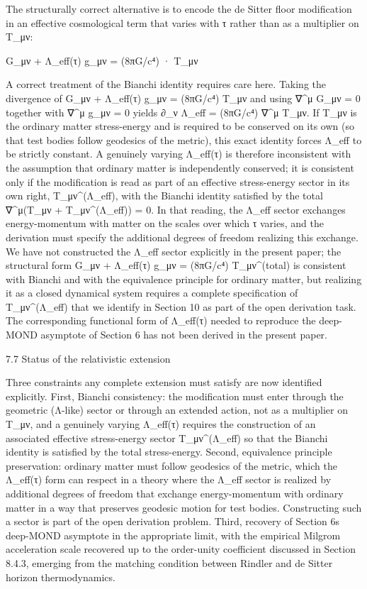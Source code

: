 \documentclass[11pt]{article}
\begin{document}
The structurally correct alternative is to encode the de Sitter floor modification in an effective cosmological term that varies with τ rather than as a multiplier on T\_μν:

G\_μν + Λ\_eff(τ) g\_μν = (8πG/c⁴) · T\_μν

A correct treatment of the Bianchi identity requires care here. Taking the divergence of G\_μν + Λ\_eff(τ) g\_μν = (8πG/c⁴) T\_μν and using ∇\^{}μ G\_μν = 0 together with ∇\^{}μ g\_μν = 0 yields ∂\_ν Λ\_eff = (8πG/c⁴) ∇\^{}μ T\_μν. If T\_μν is the ordinary matter stress-energy and is required to be conserved on its own (so that test bodies follow geodesics of the metric), this exact identity forces Λ\_eff to be strictly constant. A genuinely varying Λ\_eff(τ) is therefore inconsistent with the assumption that ordinary matter is independently conserved; it is consistent only if the modification is read as part of an effective stress-energy sector in its own right, T\_μν\^{}(Λ\_eff), with the Bianchi identity satisfied by the total ∇\^{}μ(T\_μν + T\_μν\^{}(Λ\_eff)) = 0. In that reading, the Λ\_eff sector exchanges energy-momentum with matter on the scales over which τ varies, and the derivation must specify the additional degrees of freedom realizing this exchange. We have not constructed the Λ\_eff sector explicitly in the present paper; the structural form G\_μν + Λ\_eff(τ) g\_μν = (8πG/c⁴) T\_μν\^{}(total) is consistent with Bianchi and with the equivalence principle for ordinary matter, but realizing it as a closed dynamical system requires a complete specification of T\_μν\^{}(Λ\_eff) that we identify in Section 10 as part of the open derivation task. The corresponding functional form of Λ\_eff(τ) needed to reproduce the deep-MOND asymptote of Section 6 has not been derived in the present paper.

7.7 Status of the relativistic extension

Three constraints any complete extension must satisfy are now identified explicitly. First, Bianchi consistency: the modification must enter through the geometric (Λ-like) sector or through an extended action, not as a multiplier on T\_μν, and a genuinely varying Λ\_eff(τ) requires the construction of an associated effective stress-energy sector T\_μν\^{}(Λ\_eff) so that the Bianchi identity is satisfied by the total stress-energy. Second, equivalence principle preservation: ordinary matter must follow geodesics of the metric, which the Λ\_eff(τ) form can respect in a theory where the Λ\_eff sector is realized by additional degrees of freedom that exchange energy-momentum with ordinary matter in a way that preserves geodesic motion for test bodies. Constructing such a sector is part of the open derivation problem. Third, recovery of Section 6\textquotesingle s deep-MOND asymptote in the appropriate limit, with the empirical Milgrom acceleration scale recovered up to the order-unity coefficient discussed in Section 8.4.3, emerging from the matching condition between Rindler and de Sitter horizon thermodynamics.
\end{document}
